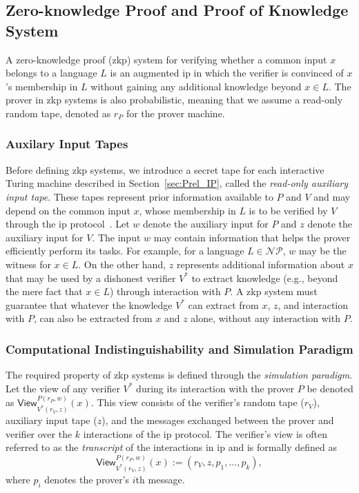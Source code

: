 \subsection{Zero-knowledge Proof and Proof of Knowledge System}

A zero-knowledge proof (\gls{zkp}) system for verifying whether a common input \( x \) belongs to a language \( L \) is an augmented \gls{ip} in which the verifier is convinced of \( x \)'s membership in \( L \) without gaining any additional knowledge beyond \( x \in L \). The prover in \gls{zkp} systems is also probabilistic, meaning that we assume a read-only random tape, denoted as $r_P$ for the prover machine. 

\subsubsection{Auxilary Input Tapes}
Before defining \gls{zkp} systems, we introduce a secret tape for each interactive Turing machine described in Section~\ref{sec:Prel_IP}, called the \textit{read-only auxiliary input tape}. These tapes represent prior information available to \( P \) and \( V \) and may depend on the common input \( x \), whose membership in \( L \) is to be verified by \( V \) through the \gls{ip} protocol~\cite{Goldreich2001Book}. Let \( w \) denote the auxiliary input for \( P \) and \( z \) denote the auxiliary input for \( V \). The input \( w \) may contain information that helps the prover efficiently perform its tasks. For example, for a language \( L \in \mathcal{NP} \), \( w \) may be the witness for \( x \in L \). 
On the other hand, \( z \) represents additional information about \( x \) that may be used by a dishonest verifier \( V^* \) to extract knowledge (e.g., beyond the mere fact that \( x \in L \)) through interaction with \( P \). A \gls{zkp} system must guarantee that whatever the knowledge \( V^* \) can extract from \( x \), \( z \), and interaction with \( P \), can also be extracted from \( x \) and \( z \) alone, without any interaction with \( P \).  

\subsubsection{Computational Indistinguishability and Simulation Paradigm}  
The required property of \gls{zkp} systems is defined through the \textit{simulation paradigm}. Let the view of any verifier $V^*$ during its interaction with the prover $P$ be denoted as  
\(
\textsf{View}_{V^*(r_V, z)}^{P(r_P, w)}(x).
\)
This view consists of the verifier's random tape ($r_V$), auxiliary input tape ($z$), and the messages exchanged between the prover and verifier over the $k$ interactions of the \gls{ip} protocol. The verifier's view is often referred to as the \textit{transcript} of the interactions in \gls{ip} and is formally defined as  
\[
\textsf{View}_{V^*(r_V, z)}^{P(r_P, w)}(x) := (r_V, z, p_1, \dots, p_k),
\]  
where $p_i$ denotes the prover's $i$th message.

